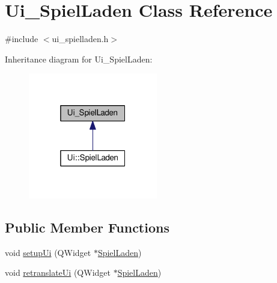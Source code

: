 \hypertarget{classUi__SpielLaden}{\section{Ui\-\_\-\-Spiel\-Laden Class Reference}
\label{classUi__SpielLaden}
}


{\ttfamily \#include $<$ui\-\_\-spielladen.\-h$>$}



Inheritance diagram for Ui\-\_\-\-Spiel\-Laden\-:\nopagebreak
\begin{figure}[H]
\begin{center}
\leavevmode
\includegraphics[width=160pt]{classUi__SpielLaden__inherit__graph}
\end{center}
\end{figure}
\subsection*{Public Member Functions}
\begin{DoxyCompactItemize}
\item 
void \hyperlink{classUi__SpielLaden_adeb9bd7b62bce434b77b2b850eec4a0f}{setup\-Ui} (Q\-Widget $\ast$\hyperlink{classSpielLaden}{Spiel\-Laden})
\item 
void \hyperlink{classUi__SpielLaden_afb2c806b4430dc0cfd815d7de63c4f15}{retranslate\-Ui} (Q\-Widget $\ast$\hyperlink{classSpielLaden}{Spiel\-Laden})
\end{DoxyCompactItemize}
